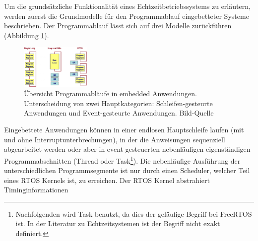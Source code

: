 Um die grund\-sätz\-liche Funktionalität eines Echtzeitbetriebssystems zu erläutern, werden zuerst die Grundmodelle für den Programmablauf eingebetteter Systeme beschrieben. Der Programmablauf lässt sich auf drei Modelle zu\-rück\-füh\-ren\cite{RTOSRevealed} (Abbildung \ref{fig:Programmablauf}). 
\begin{figure}[ht]
	\centering
		\includegraphics[width=0.3\textwidth]{Pictures/EmbeddedCom/cwrtos2f5c.jpg}
	\caption{Übersicht Programmabläufe in embedded Anwendungen. Unterscheidung von zwei Hauptkategorien: Schleifen-gesteurte Anwendungen und Event-gesteurte Anwendungen. Bild-Quelle~\protect{}}
	\label{fig:Programmablauf}
\end{figure}
Eingebettete Anwendungen können in einer endlosen Hauptschleife laufen (mit und ohne Interruptunterbrechungen), in der die Anweisungen sequenziell abgearbeitet werden oder aber in event-gesteuerten ne\-ben\-läuf\-igen ei\-gen\-stän\-dig\-en Pro\-gramm\-ab\-schnit\-ten (Thre\-ad oder Task\footnote{Nachfolgenden wird Task benutzt, da dies der geläufige Begriff bei FreeRTOS ist. In der Literatur zu Echtzeitsystemen ist der Begriff nicht exakt definiert.}). Die ne\-ben\-läuf\-ige Aus\-füh\-rung der unterschiedlichen Programmsegmente ist nur durch einen Scheduler, welcher Teil eines RTOS Kernels ist, zu erreichen. Der RTOS Kernel abstrahiert Timinginformationen\cite{MasteringFreeRtos} 
